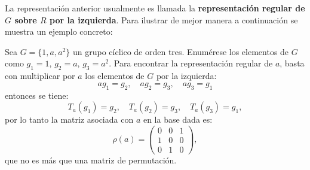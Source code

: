 La representación anterior usualmente es llamada la \textbf{representación regular de $G$ sobre $R$ por la izquierda}. Para ilustrar de mejor manera a continuación se muestra un ejemplo concreto:
\begin{ejemplo}
Sea $G = \{ 1,a,a^2 \}$ un grupo cíclico de orden tres. Enumérese los elementos de $G$ como $g_1 = 1$, $g_2 = a$, $g_3 = a^2$. Para encontrar la representación regular de $a$, basta con multiplicar por $a$ los elementos de $G$ por la izquierda:
\[ag_1 = g_2, \quad ag_2 = g_3, \quad ag_3 = g_1 
\]
entonces se tiene:
\[T_a(g_1) = g_2, \quad T_a(g_2) = g_3, \quad T_a(g_3) = g_1, \] 
por lo tanto la matriz asociada con $a$ en la base dada es:
\begin{equation*} \rho(a) =  \begin{pmatrix}
0 & 0 & 1 \\
1 & 0 & 0 \\
0 & 1 & 0
\end{pmatrix},  \end{equation*} que no es más que una matriz de permutación.
\end{ejemplo}
